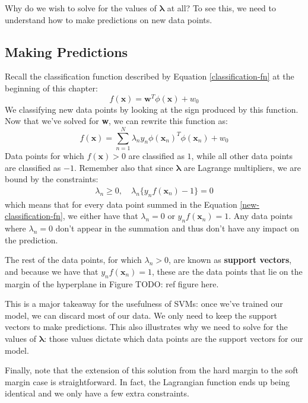 Why do we wish to solve for the values of $\boldsymbol{\lambda}$ at all? To see this, we need to understand how to make predictions on new data points.

\subsection{Making Predictions}
Recall the classification function described by Equation \ref{classification-fn} at the beginning of this chapter:
\begin{equation*}
f(\textbf{x}) = \textbf{w}^{T}\phi(\textbf{x}) + w_{0}
\end{equation*}
We classifying new data points by looking at the sign produced by this function. Now that we've solved for \textbf{w}, we can rewrite this function as:
\begin{equation} \label{new-classification-fn}
	f(\textbf{x}) = \sum_{n=1}^{N} \lambda_{n} y_{n} \phi(\textbf{x}_{n})^{T} \phi(\textbf{x}_{n}) + w_{0}
\end{equation}
Data points for which $f(\textbf{x}) > 0$ are classified as $1$, while all other data points are classified as $-1$. Remember also that since $\boldsymbol{\lambda}$ are Lagrange multipliers, we are bound by the constraints:
\begin{align*}
	\lambda_{n} \geq 0, \quad \lambda_{n} \{y_{n} f(\textbf{x}_{n}) - 1\} = 0
\end{align*}
which means that for every data point summed in the Equation \ref{new-classification-fn}, we either have that $\lambda_{n} = 0$ or $y_{n} f(\textbf{x}_{n}) = 1$. Any data points where $\lambda_{n} = 0$ don't appear in the summation and thus don't have any impact on the prediction.

The rest of the data points, for which $\lambda_{n} > 0$, are known as \textbf{support vectors}, and because we have that $y_{n} f(\textbf{x}_{n}) = 1$, these are the data points that lie on the margin of the hyperplane in Figure TODO: ref figure here.

This is a major takeaway for the usefulness of SVMs: once we've trained our model, we can discard most of our data. We only need to keep the support vectors to make predictions. This also illustrates why we need to solve for the values of $\boldsymbol{\lambda}$: those values dictate which data points are the support vectors for our model.

Finally, note that the extension of this solution from the hard margin to the soft margin case is straightforward. In fact, the Lagrangian function ends up being identical and we only have a few extra constraints.

